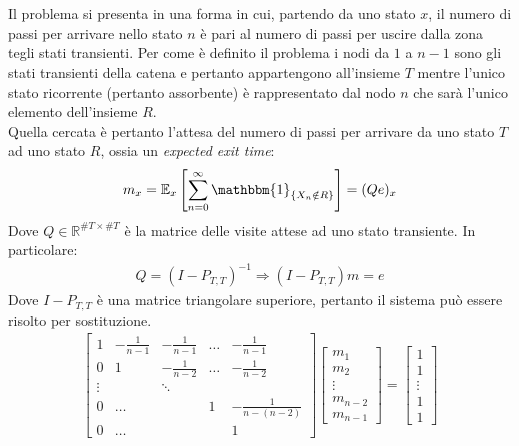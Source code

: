 \documentclass[12pt]{homework}
\begin{document}
\newpage

\section{}%
Il problema si presenta in una forma in cui, partendo da uno stato \(x\), il numero di passi per arrivare nello stato \(n\) è pari al numero di passi per uscire dalla zona tegli stati transienti. Per come è definito il problema i nodi da \(1\) a \(n-1\) sono gli stati transienti della catena e pertanto appartengono all'insieme \(T\) mentre l'unico stato ricorrente (pertanto assorbente) è rappresentato dal nodo \(n\) che sarà l'unico elemento dell'insieme \(R\). \\
Quella cercata è pertanto l'attesa del numero di passi per arrivare da uno stato \(T\) ad uno stato \(R\), ossia un \textit{expected exit time}:
\begin{gather*}
  m_x = \mathbb{E}_x \left[ \sum \limits_{n=0}^{\infty} \mathbbm{1}_{\{X_n \notin R\}}\right] = (Qe)_x
\end{gather*}
Dove \(Q \in \mathbb{R}^{\#T \times \#T}\) è la matrice delle visite attese ad uno stato transiente. In particolare:
\begin{gather*}
  Q = (I-P_{T,T})^{-1} \Rightarrow (I-P_{T,T})m = e
\end{gather*}
Dove \(I-P_{T,T}\) è una matrice triangolare superiore, pertanto il sistema può essere risolto per sostituzione.
\begin{gather*}
  \begin{bmatrix}
    1 & -\frac{1}{n-1} & -\frac{1}{n-1} & \dots & -\frac{1}{n-1} \\
    0 & 1 & -\frac{1}{n-2} & \dots & -\frac{1}{n-2} \\
    \vdots & & \ddots & & \\
    0 &\dots & & 1 & -\frac{1}{n-(n-2)}\\
    0 &\dots  & & & 1
  \end{bmatrix}
  \begin{bmatrix}
    m_1 \\ m_2 \\ \vdots \\ m_{n-2} \\ m_{n-1}
  \end{bmatrix}=
  \begin{bmatrix}
    1 \\ 1 \\ \vdots \\ 1 \\ 1
  \end{bmatrix}
\end{gather*}
\end{document}
